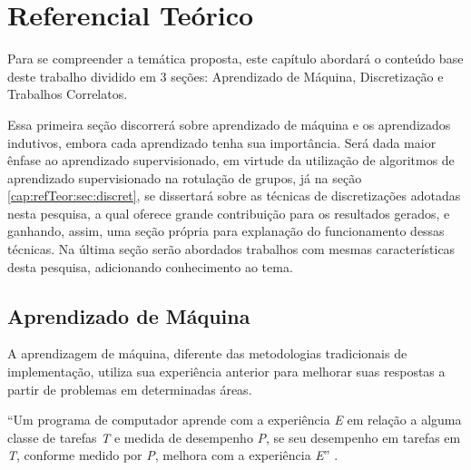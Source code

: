 \chapter{Referencial Teórico}\label{cap:refTeor}


Para se compreender a temática proposta, este capítulo abordará o conteúdo base deste trabalho dividido em 3 seções: Aprendizado de Máquina, Discretização e Trabalhos Correlatos. 

Essa primeira seção discorrerá sobre aprendizado de máquina e os aprendizados indutivos, embora cada aprendizado tenha sua importância. Será dada maior ênfase ao aprendizado supervisionado, em virtude da utilização de algoritmos de aprendizado supervisionado na rotulação de grupos, já na seção  \ref{cap:refTeor:sec:discret}, se dissertará sobre as técnicas de discretizações adotadas nesta pesquisa, a qual oferece grande contribuição para os resultados gerados, e ganhando, assim, uma seção própria para explanação do funcionamento dessas técnicas. Na última seção serão abordados trabalhos com mesmas características desta pesquisa, adicionando conhecimento ao tema. 



\section{Aprendizado de Máquina}\label{cap:refTeor:sec:aprendMaq}

A aprendizagem de máquina, diferente das metodologias tradicionais de implementação, utiliza sua experiência anterior para melhorar suas respostas a partir de problemas em determinadas áreas. 
 
 ``Um programa de computador aprende com a experiência \textit{E} em relação a alguma classe de tarefas \textit{T} e medida de desempenho \textit{P}, se seu desempenho em tarefas em \textit{T}, conforme medido por \textit{P}, melhora com a experiência \textit{E}'' \cite[p. 2]{Mitchell1997}. 
 
 

